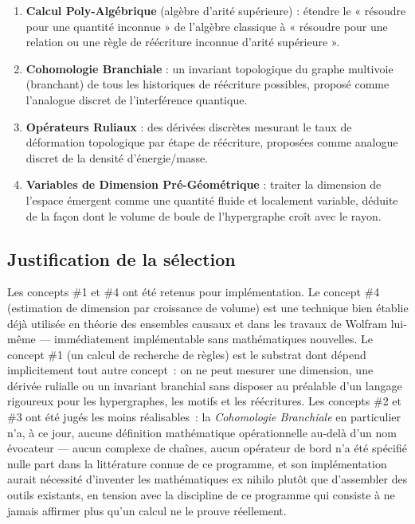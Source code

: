\documentclass[11pt,a4paper]{article}
\begin{document}
\begin{enumerate}
\item \textbf{Calcul Poly-Algébrique} (algèbre d'arité supérieure) :
  étendre le « résoudre pour une quantité inconnue » de l'algèbre classique
  à « résoudre pour une relation ou une règle de réécriture inconnue
  d'arité supérieure ».
\item \textbf{Cohomologie Branchiale} : un invariant topologique du graphe
  multivoie (branchant) de tous les historiques de réécriture possibles,
  proposé comme l'analogue discret de l'interférence quantique.
\item \textbf{Opérateurs Ruliaux} : des dérivées discrètes mesurant le taux
  de déformation topologique par étape de réécriture, proposées comme
  analogue discret de la densité d'énergie/masse.
\item \textbf{Variables de Dimension Pré-Géométrique} : traiter la
  dimension de l'espace émergent comme une quantité fluide et localement
  variable, déduite de la façon dont le volume de boule de l'hypergraphe
  croît avec le rayon.
\end{enumerate}

\subsection{Justification de la sélection}

Les concepts \#1 et \#4 ont été retenus pour implémentation. Le concept
\#4 (estimation de dimension par croissance de volume) est une technique
bien établie déjà utilisée en théorie des ensembles causaux et dans les
travaux de Wolfram lui-même --- immédiatement implémentable sans
mathématiques nouvelles. Le concept \#1 (un calcul de recherche de règles)
est le substrat dont dépend implicitement tout autre concept~: on ne peut
mesurer une dimension, une dérivée rulialle ou un invariant branchial sans
disposer au préalable d'un langage rigoureux pour les hypergraphes, les
motifs et les réécritures. Les concepts \#2 et \#3 ont été jugés les moins
réalisables~: la \emph{Cohomologie Branchiale} en particulier n'a, à ce
jour, aucune définition mathématique opérationnelle au-delà d'un nom
évocateur --- aucun complexe de chaînes, aucun opérateur de bord n'a été
spécifié nulle part dans la littérature connue de ce programme, et son
implémentation aurait nécessité d'inventer les mathématiques ex nihilo
plutôt que d'assembler des outils existants, en tension avec la discipline
de ce programme qui consiste à ne jamais affirmer plus qu'un calcul ne le
prouve réellement.
\end{document}
